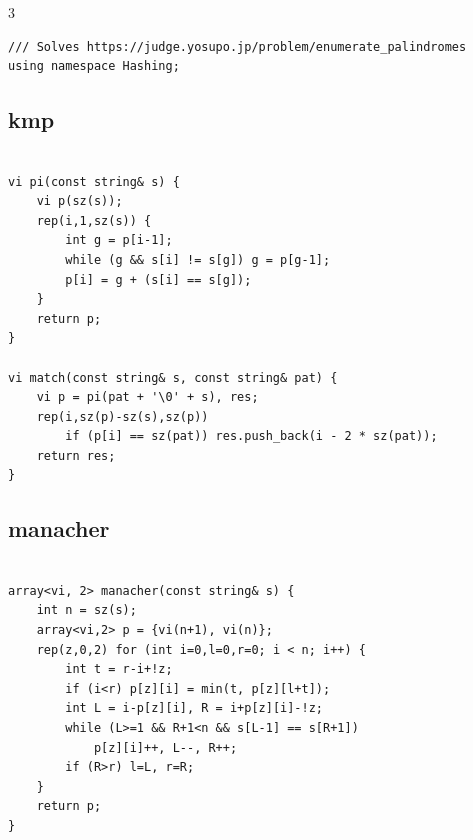 \documentclass[twoside]{article}
\begin{document}
\begin{multicols*}{3}
\begin{verbatim}
/// Solves https://judge.yosupo.jp/problem/enumerate_palindromes
using namespace Hashing;

\end{verbatim}

{
\subsection*{kmp}
}
\begin{verbatim}

vi pi(const string& s) {
    vi p(sz(s));
    rep(i,1,sz(s)) {
        int g = p[i-1];
        while (g && s[i] != s[g]) g = p[g-1];
        p[i] = g + (s[i] == s[g]);
    }
    return p;
}

vi match(const string& s, const string& pat) {
    vi p = pi(pat + '\0' + s), res;
    rep(i,sz(p)-sz(s),sz(p))
        if (p[i] == sz(pat)) res.push_back(i - 2 * sz(pat));
    return res;
}

\end{verbatim}

{
\subsection*{manacher}
}
\begin{verbatim}

array<vi, 2> manacher(const string& s) {
    int n = sz(s);
    array<vi,2> p = {vi(n+1), vi(n)};
    rep(z,0,2) for (int i=0,l=0,r=0; i < n; i++) {
        int t = r-i+!z;
        if (i<r) p[z][i] = min(t, p[z][l+t]);
        int L = i-p[z][i], R = i+p[z][i]-!z;
        while (L>=1 && R+1<n && s[L-1] == s[R+1])
            p[z][i]++, L--, R++;
        if (R>r) l=L, r=R;
    }
    return p;
}

\end{verbatim}

{
}
\end{multicols*}
\end{document}
